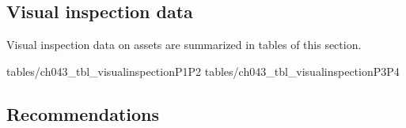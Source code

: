 









\subsection{Visual inspection data}
Visual inspection data on assets are summarized in tables of this section. %


 {tables/ch043_tbl_visualinspectionP1P2}
 {tables/ch043_tbl_visualinspectionP3P4}


\subsection{Recommendations}



